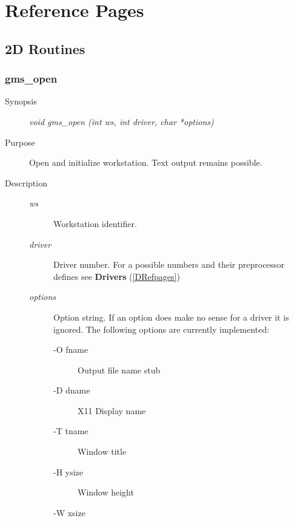\newpage



\section{Reference Pages}\label{refpages}
\subsection{2D Routines}\label{2Drefpages}

\subsubsection{gms\_open\label{gmsopen}}
\begin{description}
\item[Synopsis]\mbox{}


{\em void    gms\_open (int  ws, int driver, char *options)\/}
\item[Purpose]\mbox{}


Open and initialize workstation.
Text output remains possible. 
\item[Description]\mbox{}


\begin{description}
\item[{\em ws\/}]\mbox{}

 Workstation identifier.
\item[{\em driver\/}]\mbox{}

 Driver number. For a possible numbers and
their preprocessor defines
see 
{\bf Drivers} (\ref{DRefpages})
\item[{\em options\/}]\mbox{}

 Option string. 
If an option does make no sense for
a driver it is ignored. The following options
are currently implemented:
\begin{description}
      
\item[     -O fname]\mbox{}

  Output file name stub  
\item[     -D dname]\mbox{}

 X11 Display name
\item[     -T tname]\mbox{}

 Window title
\item[     -H ysize]\mbox{}

 Window height 
\item[     -W xsize]\mbox{}


\end{description}
\end{description}
\end{description}

